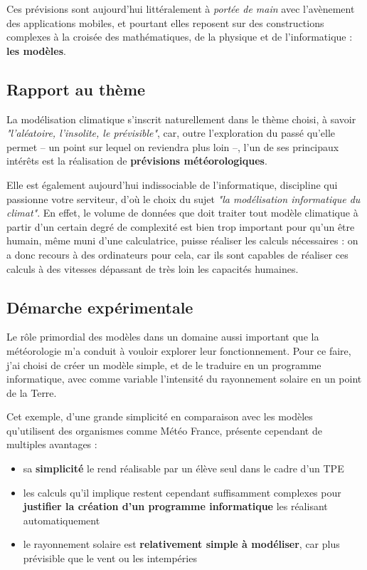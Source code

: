 \documentclass[12pt]{article}
\begin{document}
Ces prévisions sont aujourd'hui littéralement à \textit{portée de main} avec l'avènement des applications mobiles, et pourtant elles reposent sur des constructions complexes à la croisée des mathématiques, de la physique et de l'informatique : \textbf{les modèles}.

\subsection{Rapport au thème}

La modélisation climatique s'inscrit naturellement dans le thème choisi, à savoir \textit{"l'aléatoire, l'insolite, le prévisible"}, car, outre l'exploration du passé qu'elle permet -- un point sur lequel on reviendra plus loin --, l'un de ses principaux intérêts est la réalisation de \textbf{prévisions météorologiques}.

Elle est également aujourd'hui indissociable de l'informatique, discipline qui passionne votre serviteur, d'où le choix du sujet \textit{"la modélisation informatique du climat"}.
En effet, le volume de données que doit traiter tout modèle climatique à partir d'un certain degré de complexité est bien trop important pour qu'un être humain, même muni d'une calculatrice, puisse réaliser les calculs nécessaires : on a donc recours à des ordinateurs pour cela, car ils sont capables de réaliser ces calculs à des vitesses dépassant de très loin les capacités humaines.

\subsection{Démarche expérimentale}

Le rôle primordial des modèles dans un domaine aussi important que la météorologie m'a conduit à vouloir explorer leur fonctionnement.
Pour ce faire, j'ai choisi de créer un modèle simple, et de le traduire en un programme informatique, avec comme variable l'intensité du rayonnement solaire en un point de la Terre.

Cet exemple, d'une grande simplicité en comparaison avec les modèles qu'utilisent des organismes comme Météo France, présente cependant de multiples avantages :

\begin{itemize}
  \item sa \textbf{simplicité} le rend réalisable par un élève seul dans le cadre d'un TPE
  \item les calculs qu'il implique restent cependant suffisamment complexes pour \textbf{justifier la création d'un programme informatique} les réalisant automatiquement
  \item le rayonnement solaire est \textbf{relativement simple à modéliser}, car plus prévisible que le vent ou les intempéries
\end{itemize}
\end{document}
